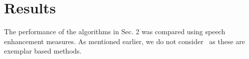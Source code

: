 \section{Results}
The performance of the algorithms in Sec. 2 was compared using speech enhancement measures. As mentioned earlier, we do not consider~\cite{baby2015coupled, baby2016phd, baby2017joint} as these are exemplar based methods.


